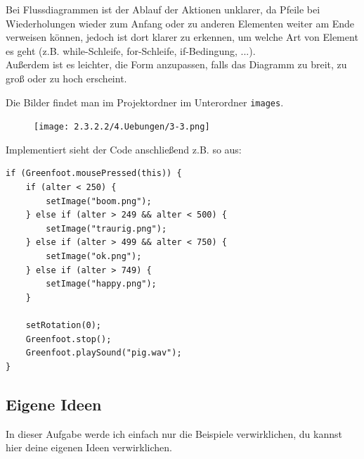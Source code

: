 \documentclass{scrartcl}   %
\begin{document}
Bei Flussdiagrammen ist der Ablauf der Aktionen unklarer, da Pfeile bei Wiederholungen wieder zum Anfang oder zu anderen Elementen weiter am Ende verweisen können, jedoch ist dort klarer zu erkennen, um welche Art von Element es geht (z.B. while-Schleife, for-Schleife, if-Bedingung, ...).\\
Außerdem ist es leichter, die Form anzupassen, falls das Diagramm zu breit, zu groß oder zu hoch erscheint.\\

\newpage

Die Bilder findet man im Projektordner im Unterordner \texttt{images}.\\

\begin{figure}[ht]
	\centering
	\texttt{[image: 2.3.2.2/4.Uebungen/3-3.png]}
\end{figure}

Implementiert sieht der Code anschließend z.B. so aus:

\begin{lstlisting}
if (Greenfoot.mousePressed(this)) {
    if (alter < 250) {
        setImage("boom.png");
    } else if (alter > 249 && alter < 500) {
        setImage("traurig.png");
    } else if (alter > 499 && alter < 750) {
        setImage("ok.png");
    } else if (alter > 749) {
        setImage("happy.png");
    }
    
    setRotation(0);
    Greenfoot.stop();
    Greenfoot.playSound("pig.wav");
}
\end{lstlisting}

\newpage

\subsection{Eigene Ideen}

In dieser Aufgabe werde ich einfach nur die Beispiele verwirklichen, du kannst hier deine eigenen Ideen verwirklichen.
\end{document}
